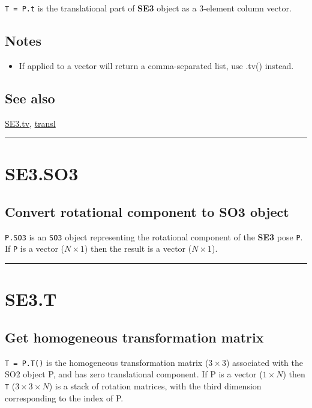 \texttt{T = P.t} is the translational part of \textbf{\color{red} SE3} object as a 3-element column
vector.


\subsection*{Notes}
\begin{itemize}
  \item If applied to  a vector will return a comma-separated list, use     .tv() instead.
\end{itemize}

\subsection*{See also}


\hyperlink{SE3.tv}{\color{blue} SE3.tv}, \hyperlink{transl}{\color{blue} transl}

\vspace{1.5ex}\hrule

\hypertarget{SE3.SO3}{\section*{SE3.SO3}}
\subsection*{Convert rotational component to SO3 object}


\texttt{P.SO3} is an \texttt{SO3} object representing the rotational component of the \textbf{\color{red} SE3}
pose \texttt{P}.  If \texttt{P} is a vector ($N \times 1$) then the result is a vector ($N \times 1$).

\vspace{1.5ex}\hrule

\hypertarget{SE3.T}{\section*{SE3.T}}
\subsection*{Get homogeneous transformation matrix}


\texttt{T = P.T()} is the homogeneous transformation matrix ($3 \times 3$) associated with the
SO2 object P, and has zero translational component.  If P is a vector
($1 \times N$) then \texttt{T} ($3 \times 3 \times N$) is a stack of rotation matrices, with the third
dimension corresponding to the index of P.



